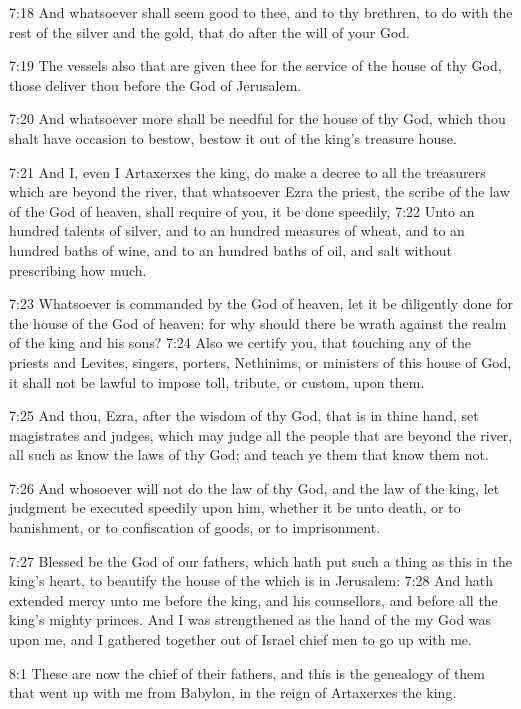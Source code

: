 7:18 And whatsoever shall seem good to thee, and to thy brethren, to do with the rest of the silver and the gold, that do after the will of your God.

7:19 The vessels also that are given thee for the service of the house of thy God, those deliver thou before the God of Jerusalem.

7:20 And whatsoever more shall be needful for the house of thy God, which thou shalt have occasion to bestow, bestow it out of the king's treasure house.

7:21 And I, even I Artaxerxes the king, do make a decree to all the treasurers which are beyond the river, that whatsoever Ezra the priest, the scribe of the law of the God of heaven, shall require of you, it be done speedily, 7:22 Unto an hundred talents of silver, and to an hundred measures of wheat, and to an hundred baths of wine, and to an hundred baths of oil, and salt without prescribing how much.

7:23 Whatsoever is commanded by the God of heaven, let it be diligently done for the house of the God of heaven: for why should there be wrath against the realm of the king and his sons?  7:24 Also we certify you, that touching any of the priests and Levites, singers, porters, Nethinims, or ministers of this house of God, it shall not be lawful to impose toll, tribute, or custom, upon them.

7:25 And thou, Ezra, after the wisdom of thy God, that is in thine hand, set magistrates and judges, which may judge all the people that are beyond the river, all such as know the laws of thy God; and teach ye them that know them not.

7:26 And whosoever will not do the law of thy God, and the law of the king, let judgment be executed speedily upon him, whether it be unto death, or to banishment, or to confiscation of goods, or to imprisonment.

7:27 Blessed be the \LORD God of our fathers, which hath put such a thing as this in the king's heart, to beautify the house of the \LORD which is in Jerusalem: 7:28 And hath extended mercy unto me before the king, and his counsellors, and before all the king's mighty princes.  And I was strengthened as the hand of the \LORD my God was upon me, and I gathered together out of Israel chief men to go up with me.

8:1 These are now the chief of their fathers, and this is the genealogy of them that went up with me from Babylon, in the reign of Artaxerxes the king.

